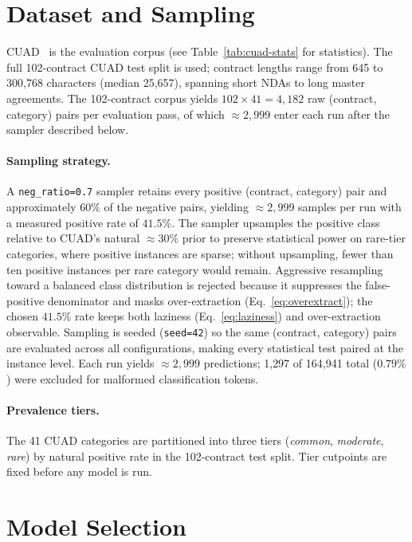 \section{Dataset and Sampling}\label{sec:meth:data}

CUAD~\cite{hendrycks2021cuad} is the evaluation corpus (see Table~\ref{tab:cuad-stats}
for statistics). The full 102-contract CUAD test split is used; contract lengths
range from 645 to 300{,}768 characters (median 25{,}657), spanning short NDAs to
long master agreements. The 102-contract corpus yields
$102 \times 41 = 4{,}182$ raw (contract, category) pairs per evaluation pass, of
which $\approx\!2{,}999$ enter each run after the sampler described below.

\paragraph{Sampling strategy.}\label{sec:meth:sampling}
A \texttt{neg\_ratio=0.7} sampler retains every positive (contract, category)
pair and approximately $60\%$ of the negative pairs, yielding $\approx\!2{,}999$
samples per run with a measured positive rate of $41.5\%$. The sampler upsamples
the positive class relative to CUAD's natural $\approx\!30\%$ prior to preserve
statistical power on rare-tier categories, where positive instances are sparse;
without upsampling, fewer than ten positive instances per rare category would
remain. Aggressive resampling toward a balanced class distribution is rejected
because it suppresses the false-positive denominator and masks over-extraction
(Eq.~\ref{eq:overextract}); the chosen $41.5\%$ rate keeps both laziness
(Eq.~\ref{eq:laziness}) and over-extraction observable. Sampling is seeded
(\texttt{seed=42}) so the same (contract, category) pairs are evaluated across
all configurations, making every statistical test paired at the instance level.
Each run yields $\approx\!2{,}999$ predictions; 1{,}297 of 164{,}941 total
($0.79\%$) were excluded for malformed classification tokens.

\paragraph{Prevalence tiers.}
The 41 CUAD categories are partitioned into three tiers (\emph{common},
\emph{moderate}, \emph{rare}) by natural positive rate in the 102-contract test
split. Tier cutpoints are fixed before any model is run.

\section{Model Selection}\label{sec:meth:models}

